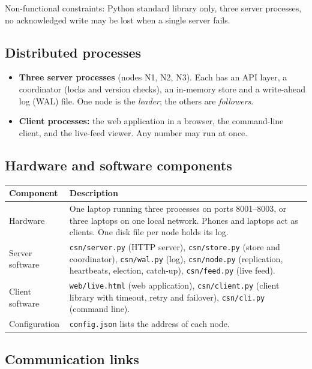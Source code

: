 \documentclass[10pt,a4paper]{article}
\newcommand{\code}[1]{\texttt{#1}}
\begin{document}
Non-functional constraints: Python standard library only, three server processes, no
acknowledged write may be lost when a single server fails.

\subsection{Distributed processes}

\begin{itemize}
\item \textbf{Three server processes} (nodes N1, N2, N3). Each has an API layer, a coordinator
(locks and version checks), an in-memory store and a write-ahead log (WAL) file. One node is the
\emph{leader}; the others are \emph{followers}.
\item \textbf{Client processes:} the web application in a browser, the command-line client, and
the live-feed viewer. Any number may run at once.
\end{itemize}

\subsection{Hardware and software components}

\begin{tabular}{@{}p{}p{}@{}}
\toprule
Component & Description \\
\midrule
Hardware & One laptop running three processes on ports 8001--8003, or three laptops on one
local network. Phones and laptops act as clients. One disk file per node holds its log. \\
Server software & \code{csn/server.py} (HTTP server), \code{csn/store.py} (store and
coordinator), \code{csn/wal.py} (log), \code{csn/node.py} (replication, heartbeats, election,
catch-up), \code{csn/feed.py} (live feed). \\
Client software & \code{web/live.html} (web application), \code{csn/client.py} (client library
with timeout, retry and failover), \code{csn/cli.py} (command line). \\
Configuration & \code{config.json} lists the address of each node. \\
\bottomrule
\end{tabular}

\subsection{Communication links}
\end{document}

